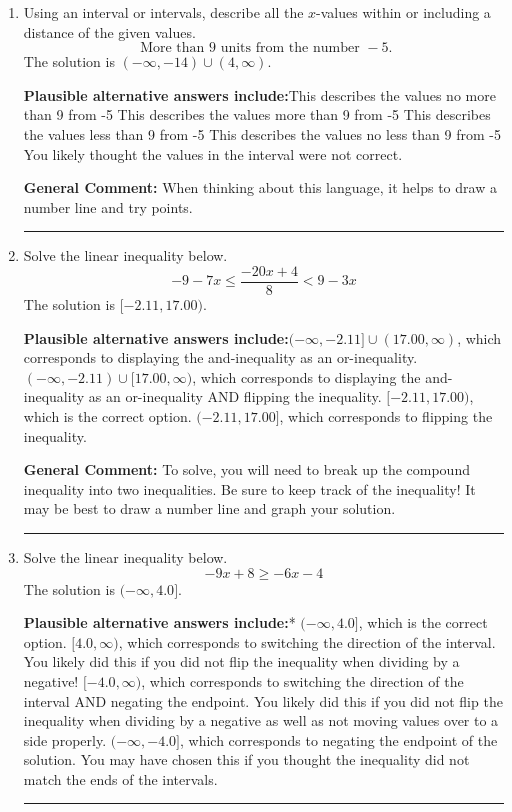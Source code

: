 \documentclass{extbook}[14pt]
\newcommand{\litem}[1]{\item #1

\rule{\textwidth}{0.4pt}}
\begin{document}
\begin{enumerate}\litem{
Using an interval or intervals, describe all the $x$-values within or including a distance of the given values.
\[ \text{ More than } 9 \text{ units from the number } -5. \]The solution is \( (-\infty, -14) \cup (4, \infty) \).\begin{enumerate}[label=\Alph*.]
\textbf{Plausible alternative answers include:}This describes the values no more than 9 from -5
This describes the values more than 9 from -5
This describes the values less than 9 from -5
This describes the values no less than 9 from -5
You likely thought the values in the interval were not correct.
\end{enumerate}

\textbf{General Comment:} When thinking about this language, it helps to draw a number line and try points.
}
\litem{
Solve the linear inequality below.
\[ -9 - 7 x \leq \frac{-20 x + 4}{8} < 9 - 3 x \]The solution is \( [-2.11, 17.00) \).\begin{enumerate}[label=\Alph*.]
\textbf{Plausible alternative answers include:}$(-\infty, -2.11] \cup (17.00, \infty)$, which corresponds to displaying the and-inequality as an or-inequality.
$(-\infty, -2.11) \cup [17.00, \infty)$, which corresponds to displaying the and-inequality as an or-inequality AND flipping the inequality.
$[-2.11, 17.00)$, which is the correct option.
$(-2.11, 17.00]$, which corresponds to flipping the inequality.

\end{enumerate}

\textbf{General Comment:} To solve, you will need to break up the compound inequality into two inequalities. Be sure to keep track of the inequality! It may be best to draw a number line and graph your solution.
}
\litem{
Solve the linear inequality below.
\[ -9x + 8 \geq -6x -4 \]The solution is \( (-\infty, 4.0] \).\begin{enumerate}[label=\Alph*.]
\textbf{Plausible alternative answers include:}* $(-\infty, 4.0]$, which is the correct option.
 $[4.0, \infty)$, which corresponds to switching the direction of the interval. You likely did this if you did not flip the inequality when dividing by a negative!
 $[-4.0, \infty)$, which corresponds to switching the direction of the interval AND negating the endpoint. You likely did this if you did not flip the inequality when dividing by a negative as well as not moving values over to a side properly.
 $(-\infty, -4.0]$, which corresponds to negating the endpoint of the solution.
You may have chosen this if you thought the inequality did not match the ends of the intervals.
\end{enumerate}

}
\end{enumerate}
\end{document}
